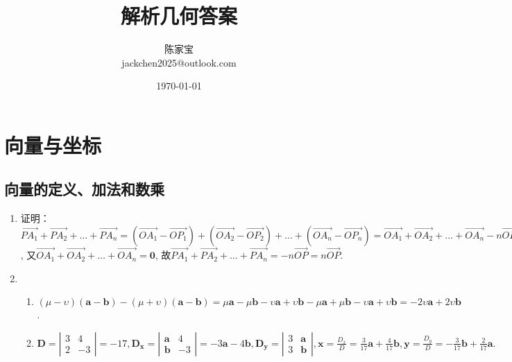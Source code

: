 \documentclass[UTF8]{ctexart}
\title{解析几何答案}
\author{陈家宝\\jackchen2025@outlook.com}
\date{\today}
\begin{document}
\maketitle
\tableofcontents

\section{向量与坐标}
\subsection{向量的定义、加法和数乘}

\begin{enumerate}
\item 证明：$\overrightarrow{PA_1}+\overrightarrow{PA_2}+ \dots +\overrightarrow{PA_n}=\left(\overrightarrow{OA_1}-\overrightarrow{OP_1}\right)+\left(\overrightarrow{OA_2}-\overrightarrow{OP_2}\right)+ \dots +\left(\overrightarrow{OA_n}-\overrightarrow{OP_n}\right)=\overrightarrow{OA_1}+\overrightarrow{OA_2}+ \dots +\overrightarrow{OA_n}-n\overrightarrow{OP}$,
又$\overrightarrow{OA_1}+\overrightarrow{OA_2}+ \dots +\overrightarrow{OA_n}=\boldsymbol{0}$,
故$\overrightarrow{PA_1}+\overrightarrow{PA_2}+ \dots +\overrightarrow{PA_n}=-n\overrightarrow{OP}=n\overrightarrow{OP}.$

\item 
\begin{enumerate}[(1)]
\item $\left(\mu - \upsilon\right)\left(\boldsymbol{a}-\boldsymbol{b}\right)-\left(\mu + \upsilon\right)\left(\boldsymbol{a}-\boldsymbol{b}\right)=\mu \boldsymbol{a}-\mu \boldsymbol{b}-\upsilon \boldsymbol{a}+\upsilon \boldsymbol{b}-\mu \boldsymbol{a}+\mu \boldsymbol{b}-\upsilon \boldsymbol{a}+\upsilon \boldsymbol{b}=-2\upsilon \boldsymbol{a}+2\upsilon \boldsymbol{b}$.
\item 
$\mathbf{D}=\left|\begin{array}{ccc}
3 & 4\\
2 & -3
\end{array} \right|
=-17,\mathbf{D_x}=\left|\begin{array}{ccc}\mathbf{a}&4\\ \mathbf{b}&-3\end{array}\right| =-3\mathbf{a}-4\mathbf{b},
\mathbf{D_y}=\left|\begin{array}{ccc} 3 & \mathbf{a}\\ 3 & \mathbf{b}\end{array}\right|,\mathbf{x}=\displaystyle\frac{D_x}{D}=\displaystyle\frac{3}{17}\mathbf{a}+\displaystyle\frac{4}{17}\mathbf{b},\mathbf{y}=\displaystyle\frac{D_y}{D}=-\displaystyle\frac{3}{17}\mathbf{b}+\displaystyle\frac{2}{17}\mathbf{a}.$
\end{enumerate}


\end{enumerate}
\end{document}
